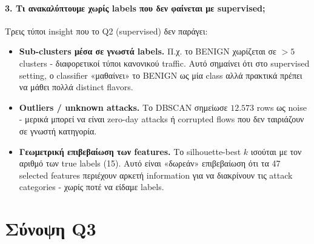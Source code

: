 \documentclass[12pt,a4paper,twoside]{book}
\begin{document}
\paragraph{3. Τι ανακαλύπτουμε χωρίς labels που δεν φαίνεται με supervised;}
Τρεις τύποι insight που το Q2 (supervised) δεν παράγει:
\begin{itemize}
    \item \textbf{Sub-clusters μέσα σε γνωστά labels.} Π.χ. το BENIGN
    χωρίζεται σε \(>5\) clusters - διαφορετικοί τύποι κανονικού
    traffic. Αυτό σημαίνει ότι στο supervised setting, ο classifier
    «μαθαίνει» το BENIGN ως μία class αλλά πρακτικά πρέπει να μάθει
    πολλά distinct flavors.
    \item \textbf{Outliers / unknown attacks.} Το DBSCAN σημείωσε
    \(12.573\) rows ως noise - μερικά μπορεί να είναι zero-day
    attacks ή corrupted flows που δεν ταιριάζουν σε γνωστή κατηγορία.
    \item \textbf{Γεωμετρική επιβεβαίωση των features.} Το silhouette-best
    \(k\) ισούται με τον αριθμό των true labels (15). Αυτό είναι «δωρεάν»
    επιβεβαίωση ότι τα 47 selected features περιέχουν αρκετή information
    για να διακρίνουν τις attack categories - χωρίς ποτέ να είδαμε labels.
\end{itemize}

\section{Σύνοψη Q3}\label{sec:q3_summary}
\end{document}
